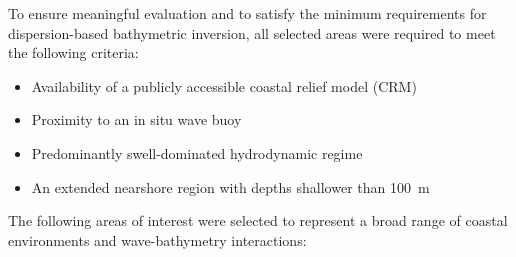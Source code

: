 \documentclass[12pt]{article}
\begin{document}
To ensure meaningful evaluation and to satisfy the minimum requirements for dispersion-based bathymetric inversion, all selected areas were required to meet the following criteria:

{\small
\begin{itemize}
    \item Availability of a publicly accessible coastal relief model (CRM)
    \item Proximity to an in situ wave buoy
    \item Predominantly swell-dominated hydrodynamic regime
    \item An extended nearshore region with depths shallower than 100~m
\end{itemize}
}

The following areas of interest were selected to represent a broad range of coastal environments and wave-bathymetry interactions:
\end{document}
